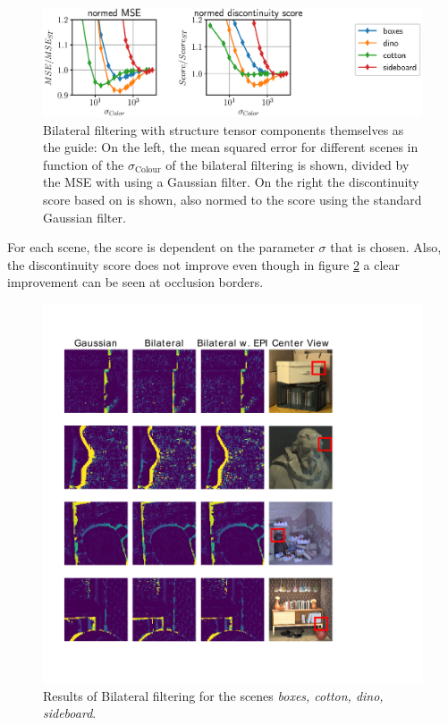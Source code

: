\documentclass  [
  paper    = a4,
  BCOR     = 10mm,
  twoside,
  fontsize = 12pt,
  fleqn,
  toc      = bibnumbered,
  toc      = listofnumbered,
  numbers  = noendperiod,
  headings = normal,
  listof   = leveldown,
  version  = 3.03
]                                       {scrreprt}
\begin{document}
 \begin{figure}[h!]
 	\centering
 	\includegraphics[width=1\linewidth]{images/bilateral_norm_params}
 	\caption[Parameter dependency for bilateral filtering]{Bilateral filtering with structure tensor components themselves as the guide: On the left, the mean squared error for different scenes in function of the $\sigma_\text{Colour}$ of the bilateral filtering is shown, divided by the MSE with using a Gaussian filter. On the right the discontinuity score based on \cite{honauer2016benchmark} is shown, also normed to the score using the standard Gaussian filter.}
 	\label{fig:bilateralnormparams}
 \end{figure}
 For each scene, the score is dependent on the parameter $\sigma$ that is chosen. Also, the discontinuity score does not improve even though in figure \ref{fig:bilatresults} a clear improvement can be seen at occlusion borders.
 \begin{figure}[h!]
 	\centering
 	\includegraphics[width=0.7\linewidth]{images/bilat_results}
 	\caption[Results of the bilateral filtering]{Results of Bilateral filtering for the scenes \textit{ boxes, cotton, dino, sideboard}.}
 	\label{fig:bilatresults}
 \end{figure}
\end{document}

